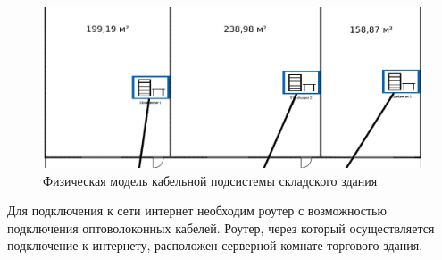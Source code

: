 \begin{figure}[H]
  \centering
  \includegraphics[width=\linewidth]{sec3/img/cisco-store.png}
  \caption{Физическая модель кабельной подсистемы складского здания}
  \label{fig:cisco-store}
\end{figure}


Для подключения к сети интернет необходим роутер с возможностью подключения оптоволоконных кабелей. Роутер, через который осуществляется подключение к интернету, расположен серверной комнате торгового здания.